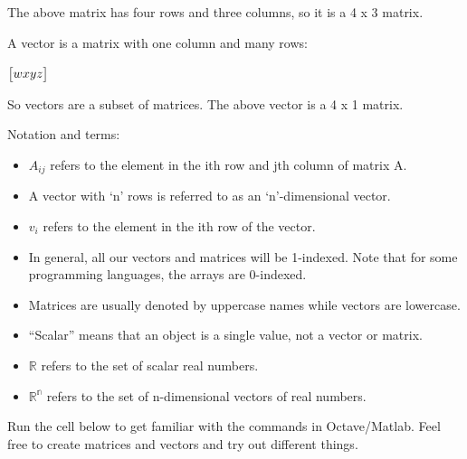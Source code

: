 \documentclass[
]{article}
\providecommand{\tightlist}{%
  \setlength{\itemsep}{0pt}\setlength{\parskip}{0pt}}
\begin{document}
The above matrix has four rows and three columns, so it is a 4 x 3
matrix.

A vector is a matrix with one column and many rows:

\(\begin{bmatrix} w \newline x \newline y \newline z \end{bmatrix}\)

So vectors are a subset of matrices. The above vector is a 4 x 1 matrix.

Notation and terms:

\begin{itemize}
\tightlist
\item
  \(A_{ij}\) refers to the element in the ith row and jth column of
  matrix A.
\item
  A vector with `n' rows is referred to as an `n'-dimensional vector.
\item
  \(v_i\) refers to the element in the ith row of the vector.
\item
  In general, all our vectors and matrices will be 1-indexed. Note that
  for some programming languages, the arrays are 0-indexed.
\item
  Matrices are usually denoted by uppercase names while vectors are
  lowercase.
\item
  ``Scalar'' means that an object is a single value, not a vector or
  matrix.
\item
  \(\mathbb{R}\) refers to the set of scalar real numbers.
\item
  \(\mathbb{R^n}\) refers to the set of n-dimensional vectors of real
  numbers.
\end{itemize}

Run the cell below to get familiar with the commands in Octave/Matlab.
Feel free to create matrices and vectors and try out different things.
\end{document}
